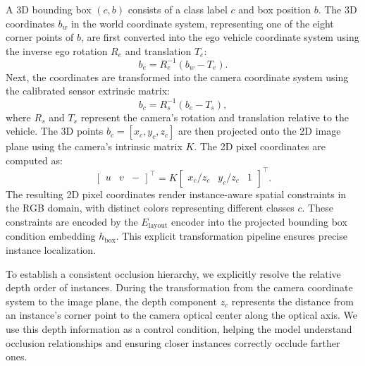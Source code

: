 A 3D bounding box $ (c, b) $ consists of a class label $ c $ and box position $ b $. The 3D coordinates $ b_w $ in the world coordinate system, representing one of the eight corner points of $ b $, are first converted into the ego vehicle coordinate system using the inverse ego rotation $ R_e $ and translation $ T_e $:
\begin{equation}
    b_e = R_e^{-1} (b_w - T_e).
\end{equation}
Next, the coordinates are transformed into the camera coordinate system using the calibrated sensor extrinsic matrix:
\begin{equation}
b_c = R_s^{-1} (b_e - T_s),
\end{equation}
where $ R_s $ and $ T_s $ represent the camera's rotation and translation relative to the vehicle. The 3D points $ b_c = [x_c, y_c, z_c] $ are then projected onto the 2D image plane using the camera's intrinsic matrix $ K $.
The 2D pixel coordinates are computed as:
\begin{equation}
\begin{bmatrix} u & v & - \end{bmatrix}^\top = K \begin{bmatrix} x_c / z_c & y_c / z_c & 1 \end{bmatrix}^\top.
\end{equation}
The resulting 2D pixel coordinates render instance-aware spatial constraints in the RGB domain, with distinct colors representing different classes $ c $. These constraints are encoded by the $ E_{\text{layout}} $ encoder into the projected bounding box condition embedding $ h_{\text{box}} $. This explicit transformation pipeline ensures precise instance localization.


To establish a consistent occlusion hierarchy, we explicitly resolve the relative depth order of instances. During the transformation from the camera coordinate system to the image plane, the depth component $ z_c $ represents the distance from an instance's corner point to the camera optical center along the optical axis. We use this depth information as a control condition, helping the model understand occlusion relationships and ensuring closer instances correctly occlude farther ones. 

